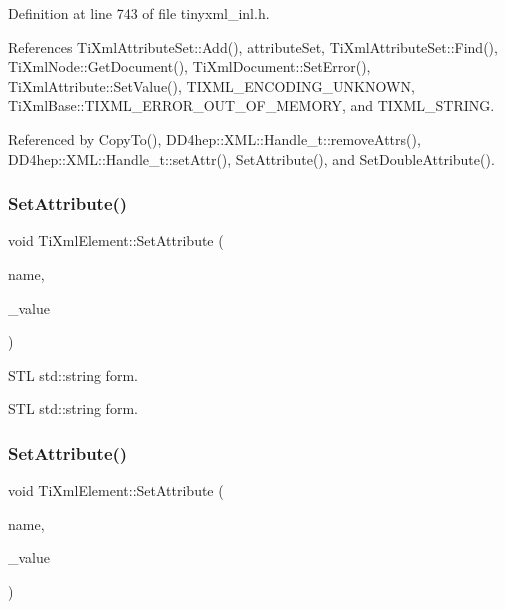 Definition at line 743 of file tinyxml\+\_\+inl.\+h.



References Ti\+Xml\+Attribute\+Set\+::\+Add(), attribute\+Set, Ti\+Xml\+Attribute\+Set\+::\+Find(), Ti\+Xml\+Node\+::\+Get\+Document(), Ti\+Xml\+Document\+::\+Set\+Error(), Ti\+Xml\+Attribute\+::\+Set\+Value(), T\+I\+X\+M\+L\+\_\+\+E\+N\+C\+O\+D\+I\+N\+G\+\_\+\+U\+N\+K\+N\+O\+WN, Ti\+Xml\+Base\+::\+T\+I\+X\+M\+L\+\_\+\+E\+R\+R\+O\+R\+\_\+\+O\+U\+T\+\_\+\+O\+F\+\_\+\+M\+E\+M\+O\+RY, and T\+I\+X\+M\+L\+\_\+\+S\+T\+R\+I\+NG.



Referenced by Copy\+To(), D\+D4hep\+::\+X\+M\+L\+::\+Handle\+\_\+t\+::remove\+Attrs(), D\+D4hep\+::\+X\+M\+L\+::\+Handle\+\_\+t\+::set\+Attr(), Set\+Attribute(), and Set\+Double\+Attribute().

\hypertarget{class_ti_xml_element_a80ed65b1d194c71c6c9986ae42337d7d}{}\label{class_ti_xml_element_a80ed65b1d194c71c6c9986ae42337d7d} 
\subsubsection{\texorpdfstring{Set\+Attribute()}{SetAttribute()}\hspace{0.1cm}{\footnotesize\ttfamily [2/4]}}
{\footnotesize\ttfamily void Ti\+Xml\+Element\+::\+Set\+Attribute (\begin{DoxyParamCaption}\item[{const std\+::string \&}]{name,  }\item[{const std\+::string \&}]{\+\_\+value }\end{DoxyParamCaption})}



S\+TL std\+::string form. 

S\+TL std\+::string form. \hypertarget{class_ti_xml_element_a6f18d54fbe25bbc527936ee65363b3c5}{}\label{class_ti_xml_element_a6f18d54fbe25bbc527936ee65363b3c5} 
\subsubsection{\texorpdfstring{Set\+Attribute()}{SetAttribute()}\hspace{0.1cm}{\footnotesize\ttfamily [3/4]}}
{\footnotesize\ttfamily void Ti\+Xml\+Element\+::\+Set\+Attribute (\begin{DoxyParamCaption}\item[{const std\+::string \&}]{name,  }\item[{int}]{\+\_\+value }\end{DoxyParamCaption})}

